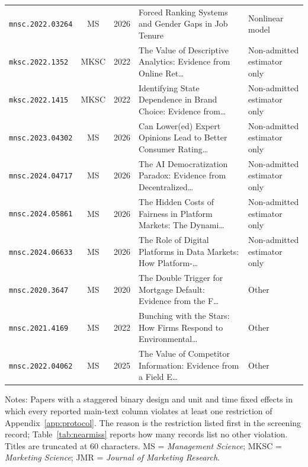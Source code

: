 \begin{longtable}{lccp{}l}
\texttt{mnsc.2022.03264} & MS & 2026 & \raggedright Forced Ranking Systems and Gender Gaps in Job Tenure & Nonlinear model \\
\texttt{mksc.2022.1352} & MKSC & 2022 & \raggedright The Value of Descriptive Analytics: Evidence from Online Ret\ldots{} & Non-admitted estimator only \\
\texttt{mksc.2022.1415} & MKSC & 2022 & \raggedright Identifying State Dependence in Brand Choice: Evidence from\ldots{} & Non-admitted estimator only \\
\texttt{mnsc.2023.04302} & MS & 2026 & \raggedright Can Lower(ed) Expert Opinions Lead to Better Consumer Rating\ldots{} & Non-admitted estimator only \\
\texttt{mnsc.2024.04717} & MS & 2026 & \raggedright The AI Democratization Paradox: Evidence from Decentralized\ldots{} & Non-admitted estimator only \\
\texttt{mnsc.2024.05861} & MS & 2026 & \raggedright The Hidden Costs of Fairness in Platform Markets: The Dynami\ldots{} & Non-admitted estimator only \\
\texttt{mnsc.2024.06633} & MS & 2026 & \raggedright The Role of Digital Platforms in Data Markets: How Platform-\ldots{} & Non-admitted estimator only \\
\texttt{mnsc.2020.3647} & MS & 2020 & \raggedright The Double Trigger for Mortgage Default: Evidence from the F\ldots{} & Other \\
\texttt{mnsc.2021.4169} & MS & 2022 & \raggedright Bunching with the Stars: How Firms Respond to Environmental\ldots{} & Other \\
\texttt{mnsc.2022.04062} & MS & 2025 & \raggedright The Value of Competitor Information: Evidence from a Field E\ldots{} & Other \\
\end{longtable}
\vspace{-0.5\baselineskip}
{\footnotesize\noindent Notes: Papers with a staggered binary design and unit and time fixed effects in which every reported main-text column violates at least one restriction of Appendix~\ref{app:protocol}. The reason is the restriction listed first in the screening record; Table~\ref{tab:nearmiss} reports how many records list no other violation. Titles are truncated at 60 characters. MS = \emph{Management Science}; MKSC = \emph{Marketing Science}; JMR = \emph{Journal of Marketing Research}.\par}
\endgroup
